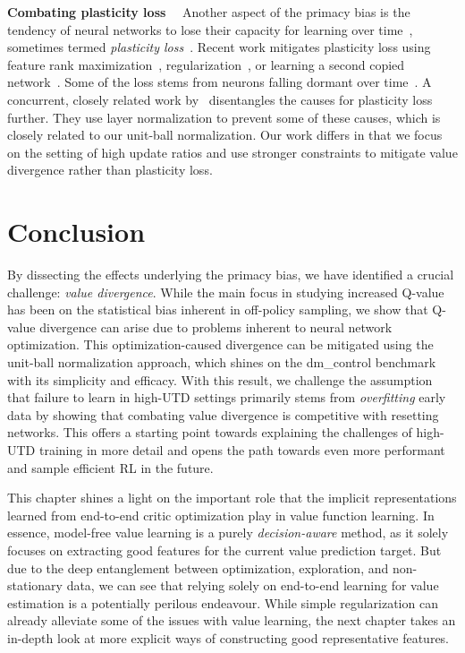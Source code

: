 {\bf Combating plasticity loss}~~ Another aspect of the primacy bias is the tendency of neural networks to lose their capacity for learning over time~\parencite{igl2021transient}, sometimes termed \emph{plasticity loss}~\parencite{lyle2022understanding, abbas2023loss}. Recent work mitigates plasticity loss using feature rank maximization~\parencite{kumar2021implicit}, regularization~\parencite{lyle2023understanding}, or learning a second copied network~\parencite{nikishin2024deep}. Some of the loss stems from neurons falling dormant over time~\parencite{sokar2023dormant}. A concurrent, closely related work by~\textcite{lyle2024disentangling} disentangles the causes for plasticity loss further. They use layer normalization to prevent some of these causes, which is closely related to our unit-ball normalization. Our work differs in that we focus on the setting of high update ratios and use stronger constraints to mitigate value divergence rather than plasticity loss. 


\section{Conclusion}

By dissecting the effects underlying the primacy bias, we have identified a crucial challenge: \emph{value divergence}. 
While the main focus in studying increased Q-value has been on the statistical bias inherent in off-policy sampling, we show that Q-value divergence can arise due to problems inherent to neural network optimization.
This optimization-caused divergence can be mitigated using the unit-ball normalization approach, which shines on the \textsf{dm\_control} benchmark with its simplicity and efficacy. 
With this result, we challenge the assumption that failure to learn in high-UTD settings primarily stems from \emph{overfitting} early data by showing that combating value divergence is competitive with resetting networks. 
This offers a starting point towards explaining the challenges of high-UTD training in more detail and opens the path towards even more performant and sample efficient RL in the future.

This chapter shines a light on the important role that the implicit representations learned from end-to-end critic optimization play in value function learning.
In essence, model-free value learning is a purely \emph{decision-aware} method, as it solely focuses on extracting good features for the current value prediction target.
But due to the deep entanglement between optimization, exploration, and non-stationary data, we can see that relying solely on end-to-end learning for value estimation is a potentially perilous endeavour.
While simple regularization can already alleviate some of the issues with value learning,  the next chapter takes an in-depth look at more explicit ways of constructing good representative features.
